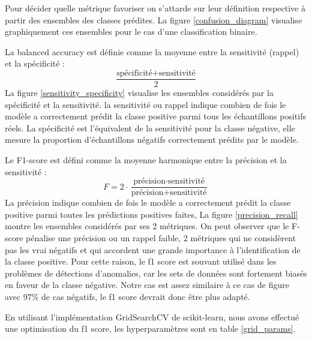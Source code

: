 Pour décider quelle métrique favoriser on s'attarde sur leur définition respective à partir des ensembles des classes prédites.
La figure \ref{confusion_diagram} visualise graphiquement ces ensembles pour le cas d'une classification binaire.

La balanced accuracy est définie comme la moyenne entre la sensitivité (rappel) et la spécificité :
$$
    \frac{\text{spécificité}+\text{sensitivité}}{2}
$$
La figure \ref{sensitivity_specificity} visualise les ensembles considérés par la spécificité et la sensitivité.
la sensitivité ou rappel indique combien de fois le modèle a correctement prédit la classe positive parmi tous les échantillons positifs réels.
La spécificité est l'équivalent de la sensitivité pour la classe négative, elle mesure la proportion d'échantillons négatifs correctement prédits par le modèle.

Le F1-score est défini comme la moyenne harmonique entre la précision et la sensitivité :
$$
    F=2\cdot\frac{\text{précision} \cdot \text{sensitivité}}{\text{précision} + \text{sensitivité}}
$$
La précision indique combien de fois le modèle a correctement prédit la classe positive parmi toutes les prédictions positives faites,
La figure \ref{precision_recall} montre les ensembles considérés par ses 2 métriques.
On peut observer que le F-score pénalise une précision ou un rappel faible, 2 métriques qui ne considèrent pas les vrai négatifs et qui accordent une grande importance à l'identification de la classe positive.
Pour cette raison, le f1 score est souvant utilisé dans les problèmes de détections d'anomalies, car les sets de données sont fortement biasés en faveur de la classe négative.
Notre cas est assez similaire à ce cas de figure avec 97\% de cas négatifs, le f1 score devrait donc être plus adapté.

En utilisant l'implémentation GridSearchCV de scikit-learn, nous avons effectué une optimisation du f1 score, les hyperparamètres sont en table \ref{grid_params}.

